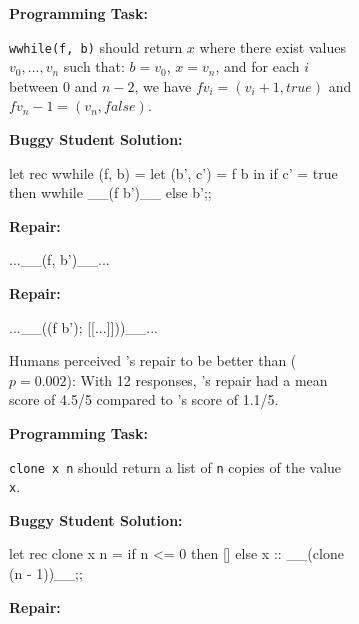 \begin{figure}
\begin{subfigure}[t]{.38\textwidth}
\begin{center}
\textbf{Programming Task:}
\end{center} 
\texttt{wwhile(f, b)} should return $x$ where 
there exist values $v_0,...,v_n$ such that:
$b = v_0$, $x = v_n$, and
for each $i$ between 0 and $n-2$, we have $f v_i = (v_i+1, true)$
and $f v_n-1 = (v_n, false)$.
\begin{center}
\textbf{Buggy Student Solution:}
\end{center}
\begin{compactcode}
let rec wwhile (f, b) =
let (b', c') = f b in if c' = true
then wwhile __(f b')__ else b';;
\end{compactcode}
\begin{center}
\textbf{\toolname Repair:}
\end{center}
\begin{compactcode}
           ...__(f, b')__...
\end{compactcode}
\begin{center}
\textbf{\seminal Repair:}
\end{center}
\begin{compactcode}
     ...__((f b'); [[...]]))__...
\end{compactcode}
\caption{Humans perceived \toolname's repair to be
better than \seminal ($p=0.002$): With 12 responses, \toolname's
repair had a mean score of 4.5/5 compared to \seminal's
score of 1.1/5.}
\label{subfig:good1}
\end{subfigure}\hfill
\begin{subfigure}[t]{.1\textwidth}
\end{subfigure}\hfill
\begin{subfigure}[t]{.28\textwidth}
\begin{center}
\textbf{Programming Task:}
\end{center}
\texttt{clone x n} should return a list of 
\texttt{n} copies of the value \texttt{x}.
\begin{center}
\textbf{Buggy Student Solution:}
\end{center}
\begin{compactcode}
let rec clone x n =
if n <= 0 then []
else x :: __(clone (n - 1))__;;
\end{compactcode}
\begin{center}
\textbf{\toolname Repair:}
\end{center}
\begin{compactcode}

\end{compactcode}
\end{subfigure}
\end{figure}
